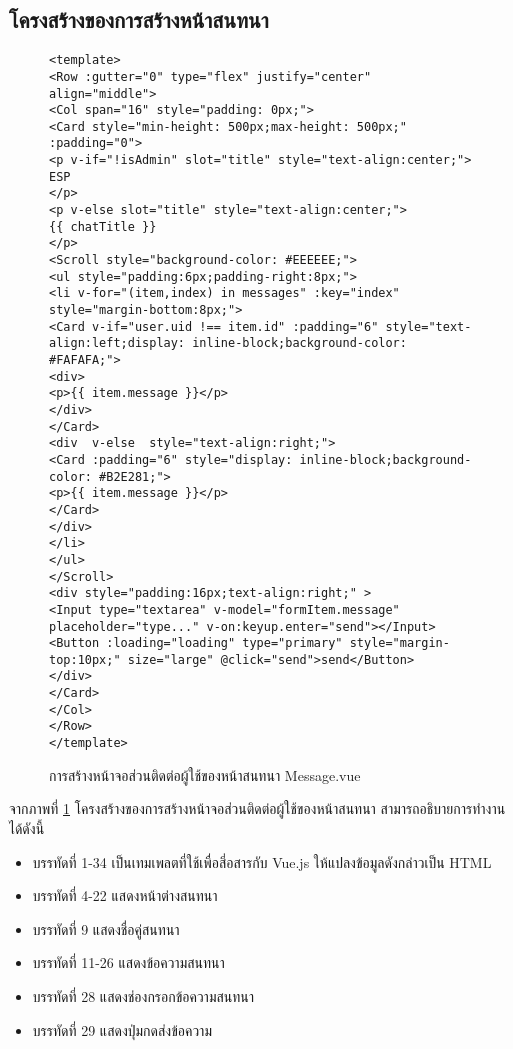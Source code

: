 	\subsection{โครงสร้างของการสร้างหน้าสนทนา}
	\begin{figure}[H]
		{\begin{lstlisting}
<template>
<Row :gutter="0" type="flex" justify="center" align="middle">
<Col span="16" style="padding: 0px;">
<Card style="min-height: 500px;max-height: 500px;" :padding="0">
<p v-if="!isAdmin" slot="title" style="text-align:center;">
ESP
</p>
<p v-else slot="title" style="text-align:center;">
{{ chatTitle }}
</p>
<Scroll style="background-color: #EEEEEE;">
<ul style="padding:6px;padding-right:8px;">
<li v-for="(item,index) in messages" :key="index" style="margin-bottom:8px;">
<Card v-if="user.uid !== item.id" :padding="6" style="text-align:left;display: inline-block;background-color: #FAFAFA;">
<div>
<p>{{ item.message }}</p> 
</div>
</Card>
<div  v-else  style="text-align:right;">
<Card :padding="6" style="display: inline-block;background-color: #B2E281;">
<p>{{ item.message }}</p>
</Card>
</div>
</li>
</ul>
</Scroll>
<div style="padding:16px;text-align:right;" >
<Input type="textarea" v-model="formItem.message" placeholder="type..." v-on:keyup.enter="send"></Input>
<Button :loading="loading" type="primary" style="margin-top:10px;" size="large" @click="send">send</Button>
</div>
</Card>
</Col>
</Row>
</template>
			\end{lstlisting}}
		\caption{การสร้างหน้าจอส่วนติดต่อผู้ใช้ของหน้าสนทนา Message.vue}
		\label{Fig:Message}
	\end{figure}
	จากภาพที่ \ref{Fig:Message} โครงสร้างของการสร้างหน้าจอส่วนติดต่อผู้ใช้ของหน้าสนทนา สามารถอธิบายการทำงานได้ดังนี้
	\begin{itemize}[label={--}]
		\item บรรทัดที่ 1-34  เป็นเทมเพลตที่ใช้เพื่อสี่อสารกับ Vue.js ให้แปลงข้อมูลดังกล่าวเป็น HTML
		\item บรรทัดที่ 4-22 แสดงหน้าต่างสนทนา
		\item บรรทัดที่ 9 แสดงชื่อคู่สนทนา
		\item บรรทัดที่ 11-26 แสดงข้อความสนทนา
		\item บรรทัดที่ 28 แสดงช่องกรอกข้อความสนทนา
		\item บรรทัดที่ 29 แสดงปุ่มกดส่งข้อความ
	\end{itemize}

